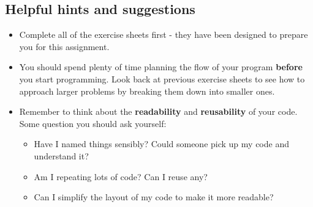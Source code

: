 \documentclass[11pt]{report}
\begin{document}
    \subsection*{Helpful hints and suggestions}
\begin{itemize}
    \item Complete all of the exercise sheets first - they have been designed to prepare you for this assignment.
	\item You should spend plenty of time planning the flow of your program \textbf{before} you start programming. Look back at previous exercise sheets to see how to approach larger problems by breaking them down into smaller ones.
	\item Remember to think about the \textbf{readability} and \textbf{reusability} of your code. Some question you should ask yourself:
	\begin{itemize}
		\item Have I named things sensibly? Could someone pick up my code and understand it?
		\item Am I repeating lots of code? Can I reuse any?
		\item Can I simplify the layout of my code to make it more readable? 
	\end{itemize}
	
	

\end{itemize}
\end{document}
